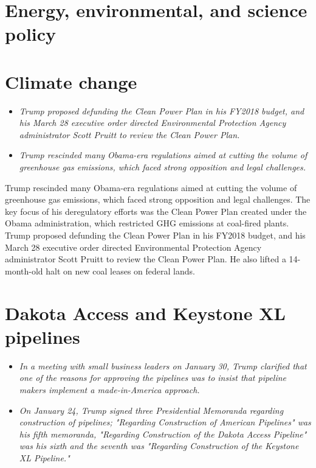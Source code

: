 \section{Energy, environmental, and science
policy}\label{energy-environmental-and-science-policy}

\section{Climate change}\label{climate-change}

\begin{itemize}
\item
  \emph{Trump proposed defunding the Clean Power Plan in his FY2018
  budget, and his March 28 executive order directed Environmental
  Protection Agency administrator Scott Pruitt to review the Clean Power
  Plan.}
\item
  \emph{Trump rescinded many Obama-era regulations aimed at cutting the
  volume of greenhouse gas emissions, which faced strong opposition and
  legal challenges.}
\end{itemize}

Trump rescinded many Obama-era regulations aimed at cutting the volume
of greenhouse gas emissions, which faced strong opposition and legal
challenges. The key focus of his deregulatory efforts was the Clean
Power Plan created under the Obama administration, which restricted GHG
emissions at coal-fired plants. Trump proposed defunding the Clean Power
Plan in his FY2018 budget, and his March 28 executive order directed
Environmental Protection Agency administrator Scott Pruitt to review the
Clean Power Plan. He also lifted a 14-month-old halt on new coal leases
on federal lands.

\section{Dakota Access and Keystone XL
pipelines}\label{dakota-access-and-keystone-xl-pipelines}

\begin{itemize}
\item
  \emph{In a meeting with small business leaders on January 30, Trump
  clarified that one of the reasons for approving the pipelines was to
  insist that pipeline makers implement a made-in-America approach.}
\item
  \emph{On January 24, Trump signed three Presidential Memoranda
  regarding construction of pipelines; "Regarding Construction of
  American Pipelines" was his fifth memoranda, "Regarding Construction
  of the Dakota Access Pipeline" was his sixth and the seventh was
  "Regarding Construction of the Keystone XL Pipeline."}
\end{itemize}


